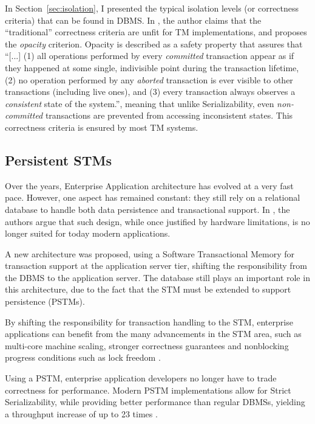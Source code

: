 \documentclass{llncs}
\begin{document}
In Section~\ref{sec:isolation}, I presented the typical isolation
levels (or correctness criteria) that can be found in DBMS. In
\cite{guerraoui2008correctness}, the author claims that the
``traditional'' correctness criteria are unfit for TM implementations,
and proposes the {\it opacity} criterion. Opacity is described as a
safety property that assures that ``[...] (1) all operations performed
by every {\it committed} transaction appear as if they happened at
some single, indivisible point during the transaction lifetime, (2) no
operation performed by any {\it aborted} transaction is ever visible
to other transactions (including live ones), and (3) every transaction
always observes a {\it consistent} state of the system.'', meaning
that unlike Serializability, even {\it non-committed} transactions are
prevented from accessing inconsistent states. This correctness
criteria is ensured by most TM systems.

\subsection{Persistent STMs}

Over the years, Enterprise Application architecture has evolved at a
very fast pace. However, one aspect has remained constant: they still
rely on a relational database to handle both data persistence and
transactional support. In \cite{fernandes2011strict}, the authors
argue that such design, while once justified by hardware limitations,
is no longer suited for today modern applications.

A new architecture was proposed, using a Software Transactional Memory
for transaction support at the application server tier, shifting the
responsibility from the DBMS to the application server. The database
still plays an important role in this architecture, due to the fact
that the STM must be extended to support persistence (PSTMs).

By shifting the responsibility for transaction handling to the STM,
enterprise applications can benefit from the many advancements in the
STM area, such as multi-core machine scaling, stronger correctness
guarantees and nonblocking progress conditions such as lock freedom
\cite{fernandes2011lock}.

Using a PSTM, enterprise application developers no longer have to
trade correctness for performance. Modern PSTM implementations allow
for Strict Serializability, while providing better performance than
regular DBMSs, yielding a throughput increase of up to 23 times
\cite{fernandes2011strict}. 
\end{document}
